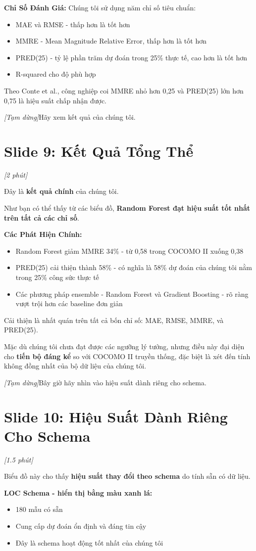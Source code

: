 \documentclass[12pt,a4paper]{article}
\newcommand{\slide}[1]{\section*{\textcolor{slidenum}{Slide #1}}}
\newcommand{\timing}[1]{\textcolor{timing}{\textit{[#1]}}}
\newcommand{\keypoint}[1]{\textcolor{keypoint}{\textbf{#1}}}
\newcommand{\pause}{\textit{[Tạm dừng]}}
\begin{document}
\textbf{Chỉ Số Đánh Giá:}
Chúng tôi sử dụng năm chỉ số tiêu chuẩn:
\begin{itemize}
    \item MAE và RMSE - thấp hơn là tốt hơn
    \item MMRE - Mean Magnitude Relative Error, thấp hơn là tốt hơn
    \item PRED(25) - tỷ lệ phần trăm dự đoán trong 25\% thực tế, cao hơn là tốt hơn
    \item R-squared cho độ phù hợp
\end{itemize}

Theo Conte et al., công nghiệp coi MMRE nhỏ hơn 0,25 và PRED(25) lớn hơn 0,75 là hiệu suất chấp nhận được.

\pause Hãy xem kết quả của chúng tôi.

\slide{9: Kết Quả Tổng Thể}
\timing{2 phút}

Đây là \keypoint{kết quả chính} của chúng tôi.

Như bạn có thể thấy từ các biểu đồ, \textbf{Random Forest đạt hiệu suất tốt nhất trên tất cả các chỉ số}.

\textbf{Các Phát Hiện Chính:}
\begin{itemize}
    \item Random Forest giảm MMRE 34\% - từ 0,58 trong COCOMO II xuống 0,38
    \item PRED(25) cải thiện thành 58\% - có nghĩa là 58\% dự đoán của chúng tôi nằm trong 25\% công sức thực tế
    \item Các phương pháp ensemble - Random Forest và Gradient Boosting - rõ ràng vượt trội hơn các baseline đơn giản
\end{itemize}

Cải thiện là nhất quán trên tất cả bốn chỉ số: MAE, RMSE, MMRE, và PRED(25).

Mặc dù chúng tôi chưa đạt được các ngưỡng lý tưởng, nhưng điều này đại diện cho \textbf{tiến bộ đáng kể} so với COCOMO II truyền thống, đặc biệt là xét đến tính không đồng nhất của bộ dữ liệu của chúng tôi.

\pause Bây giờ hãy nhìn vào hiệu suất dành riêng cho schema.

\slide{10: Hiệu Suất Dành Riêng Cho Schema}
\timing{1.5 phút}

Biểu đồ này cho thấy \keypoint{hiệu suất thay đổi theo schema} do tính sẵn có dữ liệu.

\textbf{LOC Schema - hiển thị bằng màu xanh lá:}
\begin{itemize}
    \item 180 mẫu có sẵn
    \item Cung cấp dự đoán ổn định và đáng tin cậy
    \item Đây là schema hoạt động tốt nhất của chúng tôi
\end{itemize}
\end{document}
